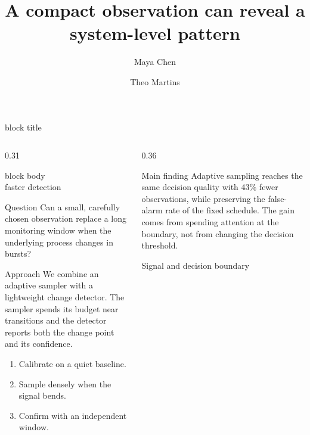 \documentclass[final]{beamer}
\title{A compact observation can reveal a system-level pattern}
\author{Maya Chen \and Theo Martins}
\institute{North Coast Systems Lab \quad\texttt{research@example.org}}
\newcommand{\metric}[2]{\begin{beamercolorbox}[rounded=true,sep=0.7em,wd=\linewidth]{block body}\centering{\fontsize{34}{38}\selectfont\color{teal}\bfseries #1}\\[-2pt]{\large #2}\end{beamercolorbox}}
\begin{document}
\begin{frame}[t]
  \begin{beamercolorbox}[wd=\paperwidth,sep=1.4em,leftskip=2em,rightskip=2em]{block title}
    {\fontsize{42}{48}\selectfont\bfseries\inserttitle}\par\vspace{0.3em}
    {\Large\insertauthor}\hfill{\large\insertinstitute}
  \end{beamercolorbox}
  \vspace{1.1em}
  \begin{columns}[t,totalwidth=0.96\paperwidth]
    \begin{column}{0.31\paperwidth}
      \metric{37\%}{faster detection}
      \vspace{0.9em}
      \begin{block}{Question}
        Can a small, carefully chosen observation replace a long monitoring
        window when the underlying process changes in bursts?
      \end{block}
      \begin{block}{Approach}
        We combine an adaptive sampler with a lightweight change detector.
        The sampler spends its budget near transitions and the detector
        reports both the change point and its confidence.
        \begin{enumerate}\itemsep0.25em
          \item Calibrate on a quiet baseline.
          \item Sample densely when the signal bends.
          \item Confirm with an independent window.
        \end{enumerate}
      \end{block}
    \end{column}
    \begin{column}{0.36\paperwidth}
      \begin{alertblock}{Main finding}
        Adaptive sampling reaches the same decision quality with 43\% fewer
        observations, while preserving the false-alarm rate of the fixed
        schedule. The gain comes from spending attention at the boundary,
        not from changing the decision threshold.
      \end{alertblock}
      \vspace{0.8em}
      \begin{block}{Signal and decision boundary}
        \centering
\end{block}
\end{column}
\end{columns}
\end{frame}
\end{document}
